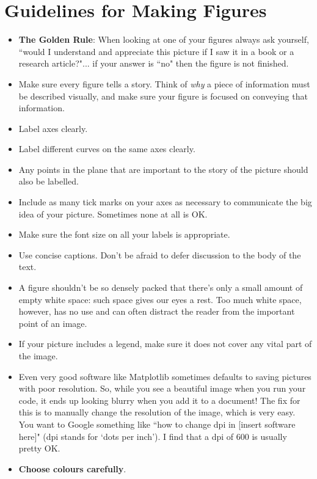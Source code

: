 \documentclass[12pt]{article}
\begin{document}
\section{Guidelines for Making Figures}
\begin{itemize}
    \item \textbf{The Golden Rule}: When looking at one of your figures always ask yourself, ``would I understand and appreciate this picture if I saw it in a book or a research article?"... if your answer is ``no" then the figure is not finished. 
    \item Make sure every figure tells a story. Think of \emph{why} a piece of information must be described visually, and make sure your figure is focused on conveying that information.  
    \item Label axes clearly. 
    \item Label different curves on the same axes clearly. 
    \item Any points in the plane that are important to the story of the picture should also be labelled. 
    \item Include as many tick marks on your axes as necessary to communicate the big idea of your picture. Sometimes none at all is OK. 
    \item Make sure the font size on all your labels is appropriate. 
    \item Use concise captions. Don't be afraid to defer discussion to the body of the text. 
    \item A figure shouldn't be so densely packed that there's only a small amount of empty white space: such space gives our eyes a rest. Too much white space, however, has no use and can often distract the reader from the important point of an image. 
    \item If your picture includes a legend, make sure it does not cover any vital part of the image. 
    \item Even very good software like Matplotlib sometimes defaults to saving pictures with poor resolution. So, while you see a beautiful image when you run your code, it ends up looking blurry when you add it to a document! The fix for this is to manually change the resolution of the image, which is very easy. You want to Google something like ``how to change dpi in [insert software here]" (dpi stands for `dots per inch'). I find that a dpi of 600 is usually pretty OK. 
    \newpage
    \item \textbf{Choose colours carefully}.
    \begin{itemize}

\end{itemize}
\end{itemize}
\end{document}
